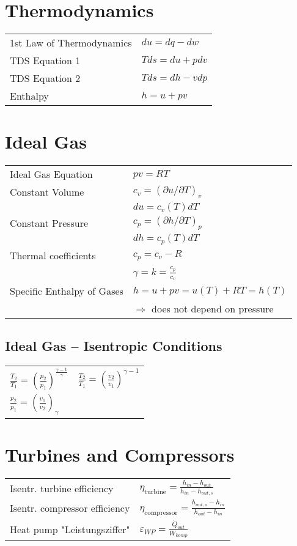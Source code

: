 




\section*{Thermodynamics}
\begin{tabular}{ m{5cm} l}
    1st Law of Thermodynamics & $du = dq - dw$  \\
    TDS Equation 1 & $Tds = du + pdv$ \\
    TDS Equation 2 & $Tds = dh - vdp$ \\
    Enthalpy & $h = u + pv$
\end{tabular}

\section*{Ideal Gas}
\begin{tabular}{ m{5cm} l}
    Ideal Gas Equation & $pv = RT$ \\
    Constant Volume & $c_v = (\partial u / \partial T)_v$ \\
     & $du = c_v (T) dT$ \\
     Constant Pressure & $c_p = (\partial h / \partial T)_p$ \\
     & $dh = c_p (T) dT$ \\
     Thermal coefficients & $c_p = c_v - R$ \\
      & $\gamma = k = \frac{c_p}{c_v}$ \\
      Specific Enthalpy of Gases & $h = u + pv = u(T) + RT = h(T)$ \\
       & $\Rightarrow$ does not depend on pressure
\end{tabular}

\subsection*{Ideal Gas – Isentropic Conditions}
\begin{tabular}{ m{5cm} l}
    $\frac{T_2}{T_1} = \left( \frac{p_2}{p_1} \right)^{ \frac{\gamma - 1}{\gamma}} $ & $\frac{T_2}{T_1} = \left( \frac{v_2}{v_1} \right)^{ \gamma -1 } $ \\
    $\frac{p_2}{p_1} = \left( \frac{v_1}{v_2} \right)_{ \gamma } $ & \\
\end{tabular}

\section*{Turbines and Compressors}
    \begin{tabular}{ m{5cm} l}
    Isentr. turbine efficiency & $\eta_{\text{turbine}} = \frac{h_{in} - h_{out}}{h_{in} - h_{out,s}}$ \\
    Isentr. compressor efficiency & $\eta_{\text{compressor}} = \frac{h_{out,s} - h_{in}}{h_{out} - h_{in}}$ \\
    Heat pump "Leistungsziffer" & $\varepsilon_{WP} = \frac{\Dot{Q}_{out}}{W_{komp}}$ \\
    \end{tabular}
    
